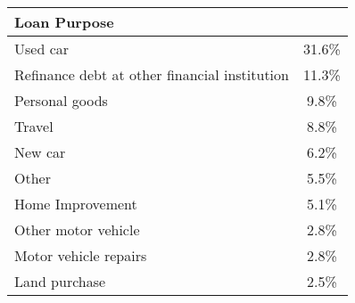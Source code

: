 \begin{tabular}{l | c}
    \textbf{Loan Purpose} & \\
    \hline
    Used car & 31.6\% \\
    Refinance debt at other financial institution & 11.3\% \\
    Personal goods & 9.8\% \\
    Travel & 8.8\% \\
    New car & 6.2\% \\
    Other & 5.5\% \\
    Home Improvement & 5.1\% \\
    Other motor vehicle & 2.8\% \\
    Motor vehicle repairs & 2.8\% \\
    Land purchase & 2.5\%
\end{tabular}



